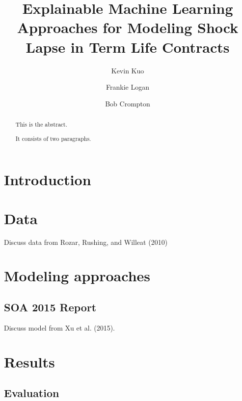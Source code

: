 \documentclass[]{elsarticle} %
\begin{document}
\begin{frontmatter}

  \title{Explainable Machine Learning Approaches for Modeling Shock Lapse in Term
Life Contracts}
    \author[rstudio]{Kevin Kuo}
    \author[kpmg]{Frankie Logan}
  
    \author[arcga]{Bob Crompton}
  
      \address[rstudio]{RStudio}
    \address[kpmg]{KPMG}
    \address[arcga]{Actuarial Resources Corporation of Georgia}
  
  \begin{abstract}
  This is the abstract.
  
  It consists of two paragraphs.
  \end{abstract}
  
 \end{frontmatter}

\hypertarget{introduction}{%
\section{Introduction}\label{introduction}}

\hypertarget{data}{%
\section{Data}\label{data}}

Discuss data from Rozar, Rushing, and Willeat (2010)

\hypertarget{modeling-approaches}{%
\section{Modeling approaches}\label{modeling-approaches}}

\hypertarget{soa-2015-report}{%
\subsection{SOA 2015 Report}\label{soa-2015-report}}

Discuss model from Xu et al. (2015).

\hypertarget{results}{%
\section{Results}\label{results}}

\hypertarget{evaluation}{%
\subsection{Evaluation}\label{evaluation}}
\end{document}
